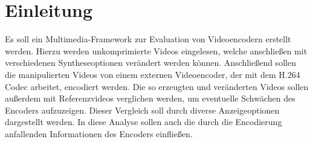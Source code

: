 \section{Einleitung}

Es soll ein Multimedia-Framework zur Evaluation von Videoencodern erstellt werden. Hierzu werden unkomprimierte Videos eingelesen, welche anschließen mit verschiedenen Syntheseoptionen verändert werden können. Anschließend sollen die manipulierten Videos von einem externen Videoencoder, der mit dem H.264 Codec arbeitet, encodiert werden. Die so erzeugten und veränderten Videos sollen außerdem mit Referenzvideos verglichen werden, um eventuelle Schwächen des Encoders aufzuzeigen. Dieser Vergleich soll durch diverse Anzeigeoptionen dargestellt werden. In diese Analyse sollen auch die durch die Encodierung anfallenden Informationen des Encoders einfließen.
